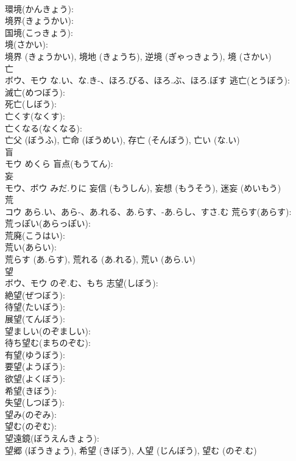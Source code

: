 \documentclass[8pt]{extreport}
\begin{document}
\begin{CJK}{UTF8}{min}
\\	環境(かんきょう): 
\\	境界(きょうかい): 
\\	国境(こっきょう): 
\\	境(さかい): 
\\	境界 (きょうかい), 境地 (きょうち), 逆境 (ぎゃっきょう), 境 (さかい)
\\	亡			
\\	ボウ、モウ	な.い、な.き-、ほろ.びる、ほろ.ぶ、ほろ.ぼす	逃亡(とうぼう): 
\\	滅亡(めつぼう): 
\\	死亡(しぼう): 
\\	亡くす(なくす): 
\\	亡くなる(なくなる): 
\\	亡父 (ぼうふ), 亡命 (ぼうめい), 存亡 (そんぼう), 亡い (な.い)
\\	盲			
\\	モウ	めくら	盲点(もうてん): 
\\	妄			
\\	モウ、ボウ	みだ.りに		妄信 (もうしん), 妄想 (もうそう), 迷妄 (めいもう)
\\	荒			
\\	コウ	あら.い、あら-、あ.れる、あ.らす、-あ.らし、すさ.む	荒らす(あらす): 
\\	荒っぽい(あらっぽい): 
\\	荒廃(こうはい): 
\\	荒い(あらい): 
\\	荒らす (あ.らす), 荒れる (あ.れる), 荒い (あら.い)
\\	望		
\\	ボウ、モウ	のぞ.む、もち	志望(しぼう): 
\\	絶望(ぜつぼう): 
\\	待望(たいぼう): 
\\	展望(てんぼう): 
\\	望ましい(のぞましい): 
\\	待ち望む(まちのぞむ): 
\\	有望(ゆうぼう): 
\\	要望(ようぼう): 
\\	欲望(よくぼう): 
\\	希望(きぼう): 
\\	失望(しつぼう): 
\\	望み(のぞみ): 
\\	望む(のぞむ): 
\\	望遠鏡(ぼうえんきょう): 
\\	望郷 (ぼうきょう), 希望 (きぼう), 人望 (じんぼう), 望む (のぞ.む)

\end{CJK}
\end{document}
